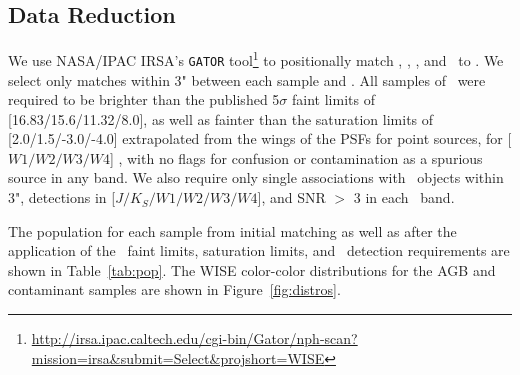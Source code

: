 \subsection{Data Reduction}
\label{sec:reduction}
We use NASA/IPAC IRSA's {\tt GATOR} tool\footnote{\url{http://irsa.ipac.caltech.edu/cgi-bin/Gator/nph-scan?mission=irsa&submit=Select&projshort=WISE}} to positionally match \sdss, \ogle, \macho, and \simbad\, to \allwise. We select only matches within 3" between  each sample and \allwise. All samples of \agb\, were required to be brighter than the published 5$\sigma$ faint limits of [16.83/15.6/11.32/8.0], as well as fainter than the saturation limits of [2.0/1.5/-3.0/-4.0] extrapolated from the wings of the PSFs for point sources, for [$W1/W2/W3/W4$] \citep{2013wise.rept....1C}, with no flags for confusion or contamination as a spurious source in any band. We also require only single associations with \twomass\, objects within 3", detections in [$J/K_S/W1/W2/W3/W4$], and SNR $>$ 3 in each \allwise\, band. 

The population for each sample from initial matching as well as after the application of the \allwise\, faint limits, saturation limits, and \twomass\, detection requirements are shown in Table~\ref{tab:pop}. The WISE color-color distributions for the AGB and contaminant samples are shown in Figure~\ref{fig:distros}. \\

\vspace{-10pt}
%

